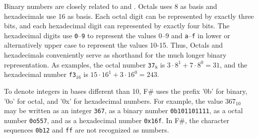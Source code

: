 \documentclass[fsharpNotes.tex]{subfiles}
\begin{document}
Binary numbers are closely related to  and . Octals uses 8 as basis and hexadecimals use 16 as basis. Each octal digit can be represented by exactly three bits, and each hexadecimal digit can represented by exactly four bits. The hexadecimal digits use \lstinline!0!--\lstinline!9! to represent the values 0--9 and \lstinline!a!--\lstinline!f! in lower or alternatively upper case to represent the values 10-15.  Thus, Octals and hexadecimals conveniently serve as shorthand for the much longer binary representation. As examples, the octal number \lstinline!37!$_8$ is $3\cdot 8^1+7\cdot 8^0=31$, and the hexadecimal number \lstinline!f3!$_{16}$ is $15\cdot 16^1+3\cdot 16^0=243$. 

To denote integers in bases different than 10, F\# uses the prefix '0b' for binary, '0o' for octal, and '0x' for hexadecimal numbers.  For example, the value $367_{10}$ may be written as an integer \lstinline!367!, as a binary number \lstinline!0b101101111!, as a octal number \lstinline!0o557!, and as a hexadecimal number \lstinline!0x16f!. In F\#, the character sequences \lstinline!0b12! and \lstinline!ff! are not recognized as numbers.
\end{document}
